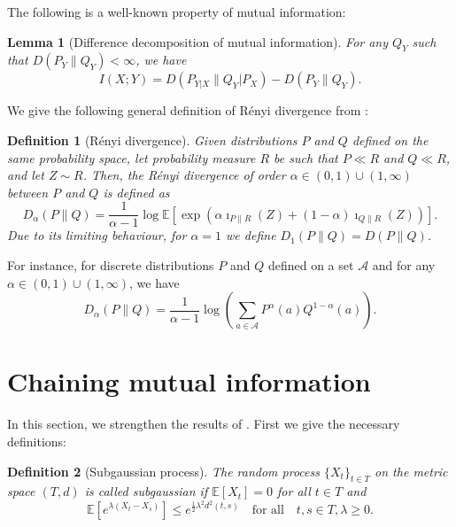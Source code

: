 \documentclass{article}
\newtheorem{definition}{Definition}
\newtheorem{lemma}{Lemma}
\newcommand{\E}{\mathbb{E}}
\begin{document}
The following is a well-known property of mutual information:
\begin{lemma}[Difference decomposition of mutual information]\label{Golden formula for MI}
	For any $Q_Y$ such that $D(P_Y\|Q_Y)<\infty$, we have 
	\begin{equation}
		I(X;Y)=D(P_{Y|X}\|Q_Y|P_X)-D(P_Y\|Q_Y). \nonumber
	\end{equation}
\end{lemma}

We give the following general definition of R\'{e}nyi divergence from \cite{verdu2015alpha}:
\begin{definition}[R\'{e}nyi divergence]
Given distributions $P$ and $Q$ defined on the same probability space, let probability measure $R$ be such that $P \ll R$ and $Q \ll R$, and let $Z \sim R$. Then, the R\'{e}nyi divergence of order $\alpha \in (0, 1) \cup (1,\infty)$ between $P$ and $Q$ is defined as
\begin{equation}
    D_{\alpha}(P\|Q)=\frac{1}{\alpha-1}\log\E \left[\exp\left(\alpha \imath_{P\|R}(Z)+(1-\alpha)\imath_{Q\|R}(Z)\right)\right]. \nonumber
\end{equation}
Due to its limiting behaviour, for $\alpha=1$ we define $D_1(P\|Q)=D(P\|Q)$. 
\end{definition}
For instance, for discrete distributions $P$ and $Q$ defined on a set $\mathcal{A}$ and for any $\alpha \in (0, 1) \cup (1,\infty)$, we have
\begin{equation}
    D_{\alpha}(P\|Q)=\frac{1}{\alpha-1}\log\left(\sum_{a\in\mathcal{A}}P^{\alpha}(a)Q^{1-\alpha}(a) \right).\nonumber
\end{equation}

\section{Chaining mutual information}\label{CMI section appendix}
In this section, we strengthen the results of \cite{asadi2018chaining}. First we give the necessary definitions:
\begin{definition}[Subgaussian process] \label{SubgaussianProcessDefinition} The random process $\{X_t\}_{t\in T}$ on the metric space $(T,d)$ is called \emph{subgaussian} if $\E[X_t]=0$ for all $t\in T$ and 
\begin{equation}\nonumber
\E[e^{\lambda(X_t-X_s)}]\leq e^{\frac12  \lambda^2 d^2(t,s)} \textrm{ ~  for all ~  } t,s\in T,  \lambda\geq 0.
\end{equation} 
\end{definition}
\end{document}
